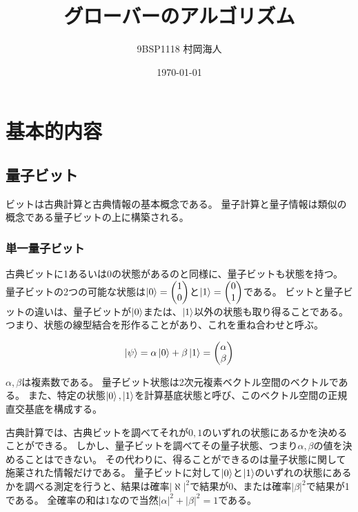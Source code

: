 \documentclass[platex,dvipdfmx]{jlreq}			%
\title{グローバーのアルゴリズム}
\author{9BSP1118 村岡海人}
\date{\today}
\begin{document}
\maketitle

\section{基本的内容}
\subsection{量子ビット}
ビットは古典計算と古典情報の基本概念である。
量子計算と量子情報は類似の概念である量子ビットの上に構築される。


\subsubsection{単一量子ビット}
古典ビットに1あるいは0の状態があるのと同様に、量子ビットも状態を持つ。
量子ビットの2つの可能な状態は$\ket{0} = \begin{pmatrix}
    1 \\
    0\\
\end{pmatrix}$と$\ket{1} = \begin{pmatrix}
    0 \\
    1 \\
\end{pmatrix}$である。
ビットと量子ビットの違いは、量子ビットが$\ket{0}$または、$\ket{1}$以外の状態も取り得ることである。
つまり、状態の線型結合を形作ることがあり、これを重ね合わせと呼ぶ。

\begin{eqnarray}
    \label{eq:superposition}
    \ket{\psi} = \alpha \ket{0} + \beta \ket{1} = \begin{pmatrix}
        \alpha \\
        \beta \\
    \end{pmatrix}
\end{eqnarray}

$\alpha, \beta$は複素数である。
量子ビット状態は2次元複素ベクトル空間のベクトルである。
また、特定の状態$\ket{0}, \ket{1}$を計算基底状態と呼び、このベクトル空間の正規直交基底を構成する。

古典計算では、古典ビットを調べてそれが$0, 1$のいずれの状態にあるかを決めることができる。
しかし、量子ビットを調べてその量子状態、つまり$\alpha, \beta$の値を決めることはできない。
その代わりに、得ることができるのは量子状態に関して施薬された情報だけである。
量子ビットに対して$\ket{0}$と$\ket{1}$のいずれの状態にあるかを調べる測定を行うと、結果は確率$|\aleph|^2$で結果が$0$、または確率$|\beta|^2$で結果が1である。
全確率の和は$1$なので当然$|\alpha|^2 + |\beta|^2 = 1$である。
\end{document}
